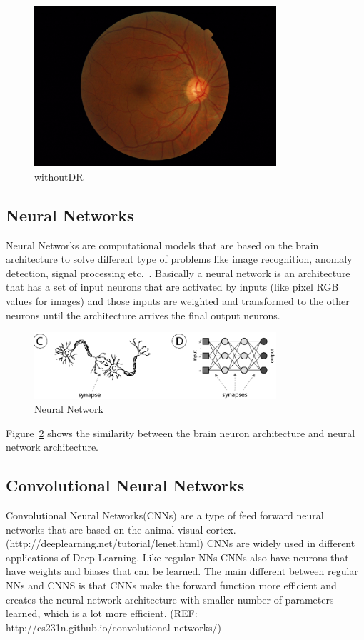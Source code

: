 \begin{figure}[t]
\caption{withoutDR}
\label{fignoDR}
\centering
\includegraphics[width=0.8\textwidth]{Figures/NODR}
\end{figure}

\subsection{Neural Networks}
Neural Networks are computational models that are based on the brain architecture to solve different type of problems like image recognition, anomaly detection, signal processing etc.\ \citep{shiffman2012nature}. Basically a neural network is an architecture that has a set of input neurons that are activated by inputs (like pixel RGB values for images) and those inputs are weighted and transformed to the other neurons until the architecture arrives the final output neurons. 

\begin{figure}[t]
\caption{Neural Network}
\label{fignn}
\centering
\includegraphics[width=0.8\textwidth]{Figures/nn}
\end{figure}

Figure~\ref{fignn} shows the similarity between the brain neuron architecture and neural network architecture. 

\subsection{Convolutional Neural Networks}
Convolutional Neural Networks(CNNs) are a type of feed forward neural networks that are based on the animal visual cortex. (http://deeplearning.net/tutorial/lenet.html) CNNs are widely used in different applications of Deep Learning. 
Like regular NNs CNNs also have neurons that have weights and biases that can be learned. The main different between regular NNs and CNNS is that CNNs make the forward function more efficient and creates the neural network architecture with smaller number of parameters learned, which is a lot more efficient. (REF: http://cs231n.github.io/convolutional-networks/) 

